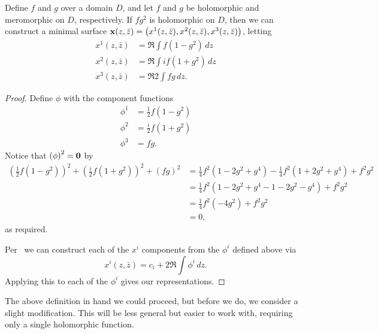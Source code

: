   \begin{thm} %
    Define $f$ and $g$ over a domain $D$, and let $f$ and $g$ be holomorphic and meromorphic on $D$, respectively. If $fg^2$ is holomorphic on $D$, then we can construct a minimal surface $\mathbf{x}(z, \bar{z}) = \left(x^1(z, \bar{z}), x^2(z, \bar{z}), x^3(z, \bar{z})\right)$, letting
    \begin{align*}
      x^1(z, \bar{z}) &= \Re\int\!f\left(1 - g^2\right)\,dz\\
      x^2(z, \bar{z}) &= \Re\int\!if\left(1 + g^2\right)\,dz\\
      x^3(z, \bar{z}) &= \Re2\int\!fg\,dz.
    \end{align*}
  \end{thm}
  \begin{proof}
    Define $\phi$ with the component functions
    \begin{align*}
      \phi^1 &= \frac{1}{2} f(1 - g^2)\\
      \phi^2 &= \frac{i}{2}f(1 + g^2)\\
      \phi^3 &= fg.
    \end{align*}
    Notice that $\left(\phi\right)^2 = \mathbf{0}$ by
    \begin{align*}
      \left(\frac{1}{2} f(1 - g^2)\right)^2 + \left(\frac{i}{2}f(1 + g^2)\right)^2 + \left(fg\right)^2 &= \frac{1}{4}f^2\left(1 - 2g^2 + g^4\right) - \frac{1}{4}f^2\left(1 + 2g^2 + g^4\right) + f^2g^2\\
      &= \frac{1}{4}f^2\left(1 - 2g^2 + g^4 - 1 - 2g^2 - g^4\right) + f^2g^2\\
      &= \frac{1}{4}f^2\left(-4g^2\right) + f^2g^2\\
      &= 0,
    \end{align*}
    as required.

    Per~\cite{Opr00} we can construct each of the $x^i$ components from the $\phi^i$ defined above via
    \[
      x^i(z, \bar{z}) = c_i + 2\Re\int\!\phi^i\,dz.
    \]
    Applying this to each of the $\phi^i$ gives our representations.
  \end{proof}

  The above definition in hand we could proceed, but before we do, we consider a slight modification. This will be less general but easier to work with, requiring only a single holomorphic function.

